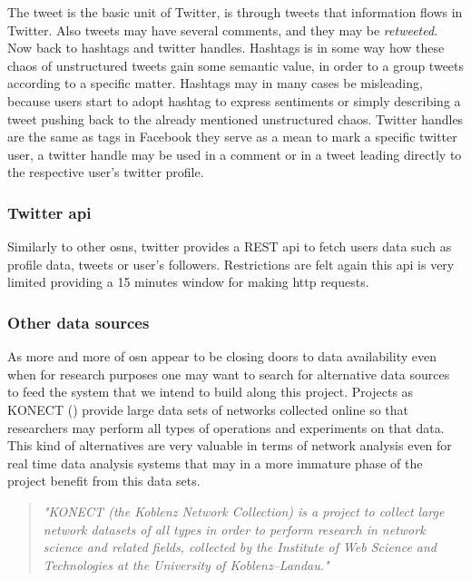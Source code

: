 \indent The tweet is the basic unit of Twitter, is through tweets that information flows in Twitter. Also tweets may have several comments, and they may
be \textit{retweeted}. Now back to hashtags and twitter handles. Hashtags is in some way how these chaos of unstructured tweets gain some semantic
value, in order to a group tweets according to a specific matter. Hashtags may in many cases be misleading, because users
start to adopt hashtag to express sentiments or simply describing a tweet pushing back to the already mentioned unstructured chaos.
Twitter handles are the same as tags in Facebook they serve as a mean to mark a specific twitter user, a twitter handle may be used in a comment or
in a tweet leading directly to the respective user's twitter profile.

\subsubsection*{Twitter \gls{api}}
Similarly to other \glspl{osn}, twitter provides a REST \gls{api} to fetch users data such as profile data, tweets or user's followers. Restrictions are felt
again this \gls{api} is very limited providing a 15 minutes window for making http requests.

\subsubsection*{Other data sources}
\label{sec:otherdatasources}
As more and more of \gls{osn} appear to be closing doors to data availability even when for research purposes one may
want to search for alternative data sources to feed the system that we intend to build along this project. Projects as
KONECT (\cite{kunegis2013konect}) provide large data sets of networks collected online so that researchers may
perform all types of operations and experiments on that data. This kind of alternatives are very valuable in terms of network
analysis even for real time data analysis systems that may in a more immature phase of the project benefit from this data sets.

\begin{quote}
\textit{"KONECT (the Koblenz Network Collection) is a project to collect large network datasets of all
types in order to perform research in network science and related fields, collected by the Institute
of Web Science and Technologies at the University of Koblenz–Landau."} \cite{kunegis2013konect}
\end{quote}


